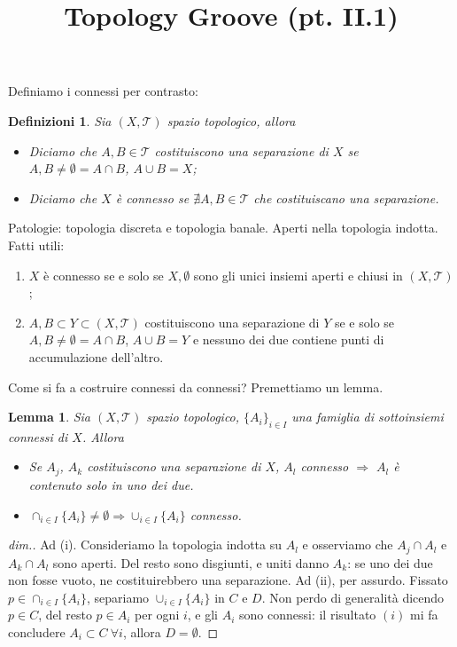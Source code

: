 \documentclass[10pt,a4paper]{article}
\title{Topology Groove (pt. II.1)}
\theoremstyle{ilemma}
\newtheorem*{lemma}{Lemma}
\theoremstyle{plain}
\theoremstyle{plain}
\theoremstyle{iother}
\theoremstyle{icorollary}
\theoremstyle{numcorollary}
\theoremstyle{plain}
\newtheorem*{definitions}{Definizioni}
\begin{document}
\maketitle

Definiamo i connessi per contrasto:
\begin{definitions}
  Sia $(X,\mathcal T)$ spazio topologico, allora
  \begin{itemize}
  \item[(i)] Diciamo che $A,B\in\mathcal T$ costituiscono una \emph{separazione}
    di $X$ se $A,B\neq\emptyset=A\cap B$, $A\cup B=X$;
  \item[(ii)] Diciamo che $X$ \`e connesso se $\nexists A,B\in\mathcal T$ che
    costituiscano una separazione.
  \end{itemize}
\end{definitions}
Patologie: topologia discreta e topologia banale. Aperti nella topologia
indotta.\newline
Fatti utili:
\begin{enumerate}
\item $X$ \`e connesso se e solo se $X,\emptyset$ sono gli unici insiemi aperti
  e chiusi in $(X,\mathcal T)$;
\item $A,B\subset Y\subset (X,\mathcal T)$ costituiscono una separazione di $Y$
  se e solo se $A,B\neq\emptyset=A\cap B$, $A\cup B=Y$ e nessuno dei due
  contiene punti di accumulazione dell'altro.
\end{enumerate}
Come si fa a costruire connessi da connessi? Premettiamo un lemma.
\begin{lemma}
  Sia $(X,\mathcal T)$ spazio topologico, $\{A_i\}_{i\in I}$ una famiglia di
  sottoinsiemi connessi di $X$. Allora
  \begin{itemize}
  \item[(i)] Se $A_j$, $A_k$ costituiscono una separazione di $X$, $A_l$
    connesso $\Rightarrow$ $A_l$ \`e contenuto solo in uno dei due.
  \item[(ii)] $\cap_{i\in I}\{A_i\}\neq\emptyset\Rightarrow \cup_{i\in
      I}\{A_i\}$ connesso.
  \end{itemize}
\end{lemma}
\begin{proof}[dim.] Ad (i). Consideriamo la topologia indotta su $A_l$ e
  osserviamo che $A_j\cap A_l$ e $A_k\cap A_l$ sono aperti. Del resto sono
  disgiunti, e uniti danno $A_k$: se uno dei due non fosse vuoto, ne
  costituirebbero una separazione.\newline
  Ad (ii), per assurdo. Fissato $p\in\cap_{i\in I}\{A_i\}$, separiamo
  $\cup_{i\in I}\{A_i\}$ in $C$ e $D$. Non perdo di generalit\`a dicendo $p\in
  C$, del resto $p\in A_i$ per ogni $i$, e gli $A_i$ sono connessi: il risultato
  $(i)$ mi fa concludere $A_i\subset C\ \forall i$, allora $D=\emptyset$.
\end{proof}
\end{document}
